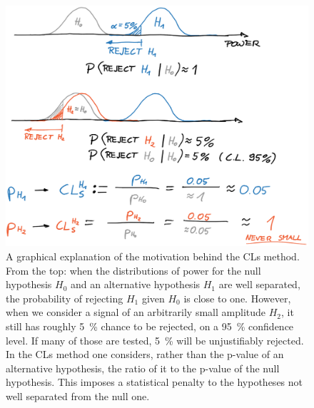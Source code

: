 
\begin{figure}
  \centering \includegraphics[width=0.8\linewidth]{gfx/axions/CLs.png}
  \caption{A graphical explanation of the motivation behind the CLs method.
  From the top: when the distributions of power for the null hypothesis $H_0$ and an alternative hypothesis $H_1$ are well separated, the probability of rejecting $H_1$ given $H_0$ is close to one.
  However, when we consider a signal of an arbitrarily small amplitude $H_2$, it still has roughly \SI{5}{\percent} chance to be rejected, on a \SI{95}{\percent} confidence level.
  If many of those are tested, \SI{5}{\percent} will be unjustifiably rejected.
  In the CLs method one considers, rather than the p-value of an alternative hypothesis, the ratio of it to the p-value of the null hypothesis.
  This imposes a statistical penalty to the hypotheses not well separated from the null one.}\label{fig:CLs}
\end{figure}

